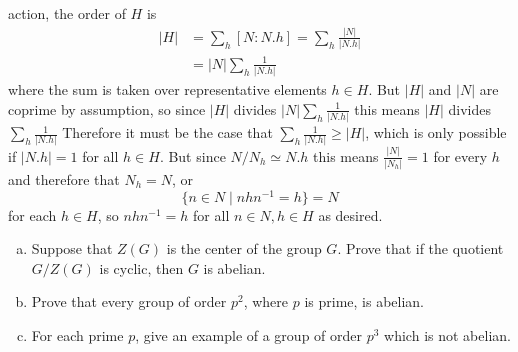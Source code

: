 \documentclass{article}
\newcounter{Problem}
\newenvironment{Problem}{\begin{Exercise}[name={Problem},
                                          counter={Problem}]}
                        {\end{Exercise}}
\begin{document}
\begin{Answer}
\begin{enumerate}[(a)]
{    action, the order of $H$ is
    \begin{align*}
    |H| &= \sum_h [N : N . h] = \sum_h \frac{|N|}{|N . h|} \\
        &= |N| \sum_h \frac{1}{|N . h|}
    \end{align*}
    where the sum is taken over representative elements $h \in H$.
    But $|H|$ and $|N|$ are coprime by assumption, so since $|H|$ divides
    $|N| \sum_h \frac{1}{|N . h|}$ this means $|H|$ divides
    $\sum_h \frac{1}{|N . h|}$ Therefore it must be the case that
    $\sum_h \frac{1}{|N . h|} \geq |H|$, which is only possible if
    $|N . h| = 1$ for all $h \in H$. But since $N / N_h \simeq N . h$
    this means $\frac{|N|}{|N_h|} = 1$ for every $h$ and therefore
    that $N_h = N$, or 
    $$
    \{ n \in N \mid n h n^{-1} = h \} = N
    $$
    for each $h \in H$, so $n h n^{-1} = h$ for all $n \in N, h \in H$
    as desired.
  }
\end{enumerate}
\end{Answer}

\pagebreak

\begin{Problem}
\begin{enumerate}[(a)]
  \item{Suppose that $Z(G)$ is the center of the group $G$. Prove that if
      the quotient $G / Z(G)$ is cyclic, then $G$ is abelian.}
  \item{Prove that every group of order $p^2$, where $p$ is prime, is
      abelian.}
  \item{For each prime $p$, give an example of a group of order $p^3$
      which is not abelian.}
\end{enumerate}
\end{Problem}
\end{document}
